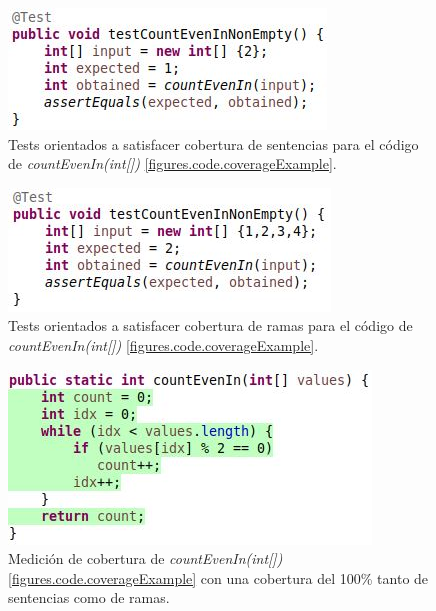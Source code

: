 
\begin{figure}
	\centering
	\includegraphics[width=.90\linewidth]{figures/stmtCoverageOrientedTests.JPG}
	\caption{Tests orientados a satisfacer cobertura de sentencias para el c\'odigo de \emph{countEvenIn(int[])} \ref{figures.code.coverageExample}.}
	\label{figures.examples.coverage.stmtTests}
\end{figure}

\begin{figure}
	\centering
	\includegraphics[width=.90\linewidth]{figures/branchCoverageOrientedTests.JPG}
	\caption{Tests orientados a satisfacer cobertura de ramas para el c\'odigo de \emph{countEvenIn(int[])} \ref{figures.code.coverageExample}.}
	\label{figures.examples.coverage.branchTests}
\end{figure}

\begin{figure}
	\centering
	\includegraphics[width=.90\linewidth]{figures/branchCoverageExampleComplete.JPG}
	\caption{Medici\'on de cobertura de \emph{countEvenIn(int[])} \ref{figures.code.coverageExample} con una cobertura del 100\% tanto de sentencias como de ramas.}
	\label{figures.examples.coverage.fullCoverage}
\end{figure}

